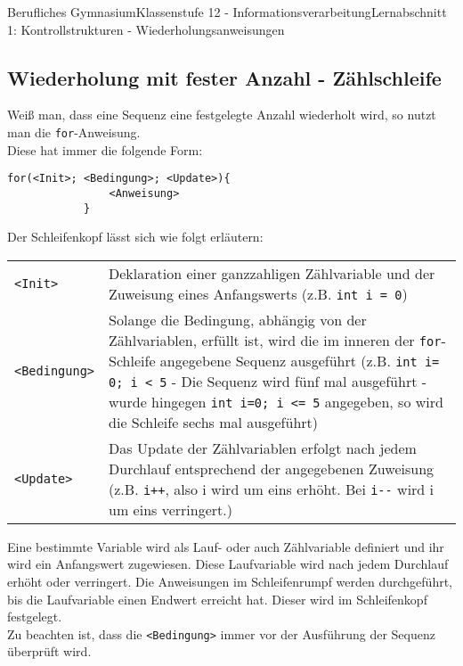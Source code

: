 \documentclass[11pt,oneside,openany,headings=optiontotoc,11pt,numbers=noenddot]{article}
\begin{document}
\begin{worksheet}{Berufliches Gymnasium}{Klassenstufe 12 - Informationsverarbeitung}{Lernabschnitt 1: Kontrollstrukturen - Wiederholungsanweisungen}
		\subsection{Wiederholung mit fester Anzahl - Zählschleife}
		Weiß man, dass eine Sequenz eine festgelegte Anzahl wiederholt wird, so nutzt man die \lstinline[style=JavaInputStyle]|for|-Anweisung.\\
		Diese hat immer die folgende Form:
		\begin{lstlisting}[style=JavaInputStyle]
			for(<Init>; <Bedingung>; <Update>){
				<Anweisung>
			}
		\end{lstlisting}
		\par\bigskip\noindent
		Der Schleifenkopf lässt sich wie folgt erläutern:\\
		\begin{tabularx}{\textwidth}{lX}
			{\lstinline[style=JavaInputStyle]|<Init>|} & Deklaration einer ganzzahligen Zählvariable und der Zuweisung eines Anfangswerts (z.B. {\lstinline[style=JavaInputStyle]|int i = 0|})\\
			{\lstinline[style=JavaInputStyle]|<Bedingung>|} & Solange die Bedingung, abhängig von der Zählvariablen, erfüllt ist, wird die im inneren der {\lstinline[style=JavaInputStyle]{for}}-Schleife angegebene Sequenz ausgeführt (z.B. {\lstinline[style=JavaInputStyle]|int i= 0; i < 5|} - Die Sequenz wird fünf mal ausgeführt - wurde hingegen {\lstinline[style=JavaInputStyle]|int i=0; i <= 5|} angegeben, so wird die Schleife sechs mal ausgeführt)\\
			{\lstinline[style=JavaInputStyle]|<Update>|} & Das Update der Zählvariablen erfolgt nach jedem Durchlauf entsprechend der angegebenen Zuweisung (z.B. {\lstinline[style=JavaInputStyle]|i++|}, also i wird um eins erhöht. Bei {\lstinline[style=JavaInputStyle]|i--|} wird i um eins verringert.)
		\end{tabularx}
		Eine bestimmte Variable wird als Lauf- oder auch Zählvariable definiert und ihr wird ein Anfangswert zugewiesen. Diese Laufvariable wird nach jedem Durchlauf erhöht oder verringert. Die Anweisungen im Schleifenrumpf werden durchgeführt, bis die Laufvariable einen Endwert erreicht hat. Dieser wird im Schleifenkopf festgelegt.\\
		Zu beachten ist, dass die {\lstinline[style=JavaInputStyle]|<Bedingung>|} immer vor der Ausführung der Sequenz überprüft wird.\\
		\par\noindent
		\begin{minipage}[t]{0.48\textwidth}

\end{minipage}
\end{worksheet}
\end{document}

